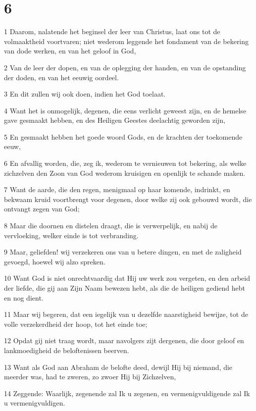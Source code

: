 \chapter{6}

\par 1 Daarom, nalatende het beginsel der leer van Christus, laat ons tot de volmaaktheid voortvaren; niet wederom leggende het fondament van de bekering van dode werken, en van het geloof in God,
\par 2 Van de leer der dopen, en van de oplegging der handen, en van de opstanding der doden, en van het eeuwig oordeel.
\par 3 En dit zullen wij ook doen, indien het God toelaat.
\par 4 Want het is onmogelijk, degenen, die eens verlicht geweest zijn, en de hemelse gave gesmaakt hebben, en des Heiligen Geestes deelachtig geworden zijn,
\par 5 En gesmaakt hebben het goede woord Gods, en de krachten der toekomende eeuw,
\par 6 En afvallig worden, die, zeg ik, wederom te vernieuwen tot bekering, als welke zichzelven den Zoon van God wederom kruisigen en openlijk te schande maken.
\par 7 Want de aarde, die den regen, menigmaal op haar komende, indrinkt, en bekwaam kruid voortbrengt voor degenen, door welke zij ook gebouwd wordt, die ontvangt zegen van God;
\par 8 Maar die doornen en distelen draagt, die is verwerpelijk, en nabij de vervloeking, welker einde is tot verbranding.
\par 9 Maar, geliefden! wij verzekeren ons van u betere dingen, en met de zaligheid gevoegd, hoewel wij alzo spreken.
\par 10 Want God is niet onrechtvaardig dat Hij uw werk zou vergeten, en den arbeid der liefde, die gij aan Zijn Naam bewezen hebt, als die de heiligen gediend hebt en nog dient.
\par 11 Maar wij begeren, dat een iegelijk van u dezelfde naarstigheid bewijze, tot de volle verzekerdheid der hoop, tot het einde toe;
\par 12 Opdat gij niet traag wordt, maar navolgers zijt dergenen, die door geloof en lankmoedigheid de beloftenissen beerven.
\par 13 Want als God aan Abraham de belofte deed, dewijl Hij bij niemand, die meerder was, had te zweren, zo zwoer Hij bij Zichzelven,
\par 14 Zeggende: Waarlijk, zegenende zal Ik u zegenen, en vermenigvuldigende zal Ik u vermenigvuldigen.
